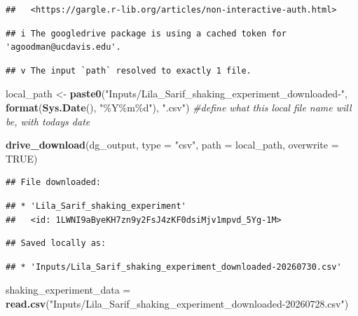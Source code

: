 \documentclass[
]{article}
\newenvironment{Shaded}{\begin{snugshade}}{\end{snugshade}}
\newcommand{\AttributeTok}[1]{\textcolor[rgb]{0.13,0.29,0.53}{#1}}
\newcommand{\CommentTok}[1]{\textcolor[rgb]{0.56,0.35,0.01}{\textit{#1}}}
\newcommand{\ConstantTok}[1]{\textcolor[rgb]{0.56,0.35,0.01}{#1}}
\newcommand{\FunctionTok}[1]{\textcolor[rgb]{0.13,0.29,0.53}{\textbf{#1}}}
\newcommand{\NormalTok}[1]{#1}
\newcommand{\OtherTok}[1]{\textcolor[rgb]{0.56,0.35,0.01}{#1}}
\newcommand{\StringTok}[1]{\textcolor[rgb]{0.31,0.60,0.02}{#1}}
\begin{document}
\begin{verbatim}
##   <https://gargle.r-lib.org/articles/non-interactive-auth.html>
\end{verbatim}

\begin{verbatim}
## i The googledrive package is using a cached token for 'agoodman@ucdavis.edu'.
\end{verbatim}

\begin{verbatim}
## v The input `path` resolved to exactly 1 file.
\end{verbatim}

\begin{Shaded}
\begin{Highlighting}[]
\NormalTok{local\_path }\OtherTok{\textless{}{-}} \FunctionTok{paste0}\NormalTok{(}\StringTok{"Inputs/Lila\_Sarif\_shaking\_experiment\_downloaded{-}"}\NormalTok{, }\FunctionTok{format}\NormalTok{(}\FunctionTok{Sys.Date}\NormalTok{(), }\StringTok{"\%Y\%m\%d"}\NormalTok{), }\StringTok{".csv"}\NormalTok{) }\CommentTok{\#define what this local file name will be, with today\textquotesingle{}s date}

\FunctionTok{drive\_download}\NormalTok{(dg\_output, }\AttributeTok{type =} \StringTok{"csv"}\NormalTok{, }\AttributeTok{path =}\NormalTok{ local\_path, }\AttributeTok{overwrite =} \ConstantTok{TRUE}\NormalTok{)}
\end{Highlighting}
\end{Shaded}

\begin{verbatim}
## File downloaded:
\end{verbatim}

\begin{verbatim}
## * 'Lila_Sarif_shaking_experiment'
##   <id: 1LWNI9aByeKH7zn9y2FsJ4zKF0dsiMjv1mpvd_5Yg-1M>
\end{verbatim}

\begin{verbatim}
## Saved locally as:
\end{verbatim}

\begin{verbatim}
## * 'Inputs/Lila_Sarif_shaking_experiment_downloaded-20260730.csv'
\end{verbatim}

\begin{Shaded}
\begin{Highlighting}[]
\NormalTok{shaking\_experiment\_data }\OtherTok{=} \FunctionTok{read.csv}\NormalTok{(}\StringTok{"Inputs/Lila\_Sarif\_shaking\_experiment\_downloaded{-}20260728.csv"}\NormalTok{)}
\end{Highlighting}
\end{Shaded}
\end{document}
